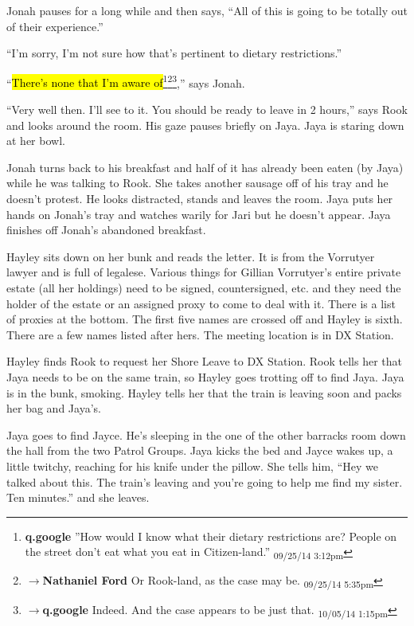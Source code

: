 Jonah pauses for a long while and then says, ``All of this is going to be totally out of their experience.''

``I'm sorry, I'm not sure how that's pertinent to dietary restrictions.''

``\hl{There's none that I'm aware of}\footnote{\textbf{q.google }''How would I know what their dietary restrictions are?  People on the street don't eat what you eat in Citizen-land.'' \textsubscript{09/25/14 3:12pm}}\footnote{$\rightarrow$\textbf{Nathaniel Ford }Or Rook-land, as the case may be. \textsubscript{09/25/14 5:35pm}}\footnote{$\rightarrow$\textbf{q.google }Indeed.  And the case appears to be just that. \textsubscript{10/05/14 1:15pm}},'' says Jonah.

``Very well then.  I'll see to it.  You should be ready to leave in 2 hours,'' says Rook and looks around the room.  His gaze pauses briefly on Jaya.  Jaya is staring down at her bowl.

Jonah turns back to his breakfast and half of it has already been eaten (by Jaya) while he was talking to Rook.  She takes another sausage off of his tray and he doesn't protest.  He looks distracted, stands and leaves the room.  Jaya puts her hands on Jonah's tray and watches warily for Jari but he doesn't appear.  Jaya finishes off Jonah's abandoned breakfast.



Hayley sits down on her bunk and reads the letter.  It is from the Vorrutyer lawyer and is full of legalese.  Various things for Gillian Vorrutyer's entire private estate (all her holdings) need to be signed, countersigned, etc. and they need the holder of the estate or an assigned proxy to come to deal with it.  There is a list of proxies at the bottom.  The first five names are crossed off and Hayley is sixth.  There are a few names listed after hers.  The meeting location is in DX Station.



Hayley finds Rook to request her Shore Leave to DX Station.  Rook tells her that Jaya needs to be on the same train, so Hayley goes trotting off to find Jaya.  Jaya is in the bunk, smoking.  Hayley tells her that the train is leaving soon and packs her bag and Jaya's.



Jaya goes to find Jayce.  He's sleeping in the one of the other barracks room down the hall from the two Patrol Groups.  Jaya kicks the bed and Jayce wakes up, a little twitchy, reaching for his knife under the pillow.  She tells him, ``Hey we talked about this.  The train's leaving and you're going to help me find my sister.   Ten minutes.'' and she leaves.



